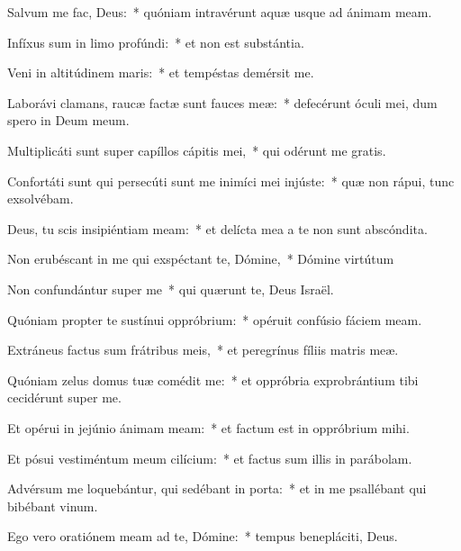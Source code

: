 \item Salvum me fac, Deus:~* quóniam intravérunt aquæ usque ad ánimam meam.

\item Infíxus sum in limo profúndi:~* et non est substántia.

\item Veni in altitúdinem maris:~* et tempéstas demérsit me.

\item Laborávi clamans, raucæ factæ sunt fauces meæ:~* defecérunt óculi mei, dum spero in Deum meum.

\item Multiplicáti sunt super capíllos cápitis mei,~* qui odérunt me gratis.

\item Confortáti sunt qui persecúti sunt me inimíci mei injúste:~* quæ non rápui, tunc exsolvébam.

\item Deus, tu scis insipiéntiam meam:~* et delícta mea a te non sunt abscóndita.

\item Non erubéscant in me qui exspéctant te, Dómine,~* Dómine virtútum

\item Non confundántur super me~* qui quærunt te, Deus Israël.

\item Quóniam propter te sustínui oppróbrium:~* opéruit confúsio fáciem meam.

\item Extráneus factus sum frátribus meis,~* et peregrínus fíliis matris meæ.

\item Quóniam zelus domus tuæ comédit me:~* et oppróbria exprobrántium tibi cecidérunt super me.

\item Et opérui in jejúnio ánimam meam:~* et factum est in oppróbrium mihi.

\item Et pósui vestiméntum meum cilícium:~* et factus sum illis in parábolam.

\item Advérsum me loquebántur, qui sedébant in porta:~* et in me psallébant qui bibébant vinum.

\item Ego vero oratiónem meam ad te, Dómine:~* tempus benepláciti, Deus.

